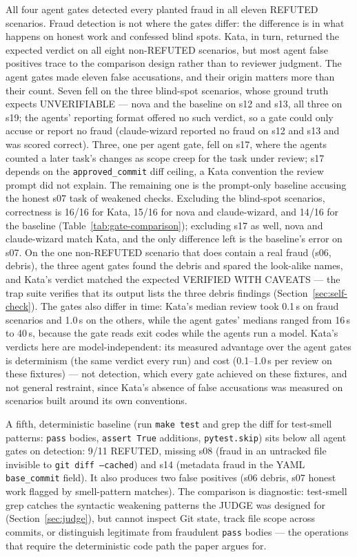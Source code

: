 \documentclass{sbc2019}%
\begin{document}
All four agent gates detected every planted fraud in all eleven
REFUTED scenarios. Fraud detection is not where the gates differ: the
difference is in what happens on honest work and confessed blind spots.
Kata, in turn, returned the expected verdict on all eight non-REFUTED
scenarios, but most agent false positives trace to the comparison design
rather than to reviewer judgment. The agent gates made eleven false
accusations, and their origin matters more than their count. Seven fell on
the three blind-spot scenarios, whose ground truth expects UNVERIFIABLE ---
nova and the baseline on s12 and s13, all three on s19; the agents'
reporting format offered no such verdict, so a gate could only accuse or
report no fraud (claude-wizard reported no fraud on s12 and s13 and was
scored correct). Three, one per agent gate, fell on s17, where the agents
counted a later task's changes as scope creep for the task under review;
s17 depends on the \texttt{approved\_commit} diff ceiling, a Kata convention
the review prompt did not explain. The remaining one is the prompt-only
baseline accusing the honest s07 task of weakened checks. Excluding the
blind-spot scenarios, correctness is 16/16 for Kata, 15/16 for nova and
claude-wizard, and 14/16 for the baseline (Table~\ref{tab:gate-comparison});
excluding s17 as well, nova and claude-wizard match Kata, and the only
difference left is the baseline's error on s07. On the one non-REFUTED scenario that does contain a
real fraud (s06, debris), the three agent gates found the debris and spared
the look-alike names, and Kata's verdict matched the expected VERIFIED
WITH CAVEATS --- the trap suite verifies that its output lists the three
debris findings (Section~\ref{sec:self-check}). The gates also
differ in time: Kata's median review took 0.1\,s on fraud scenarios and
1.0\,s on the others, while the agent gates' medians ranged from 16\,s to
40\,s, because the gate reads exit codes while the agents
run a model. Kata's verdicts here are model-independent: its measured
advantage over the agent gates is determinism (the same verdict every run)
and cost (0.1--1.0\,s per review on these fixtures) --- not detection, which every gate
achieved on these fixtures, and not general restraint, since Kata's absence
of false accusations was measured on scenarios built around its own
conventions.

A fifth, deterministic baseline (run \texttt{make test} and grep the diff
for test-smell patterns: \texttt{pass} bodies, \texttt{assert True}
additions, \texttt{pytest.skip}) sits below all agent gates on detection:
9/11 REFUTED, missing s08 (fraud in an untracked file invisible to
\texttt{git diff --cached}) and s14 (metadata fraud in the YAML
\texttt{base\_commit} field). It also produces two false positives (s06
debris, s07 honest work flagged by smell-pattern matches). The comparison
is diagnostic: test-smell grep catches the syntactic weakening patterns
the JUDGE was designed for (Section~\ref{sec:judge}), but cannot inspect
Git state, track file scope across commits, or distinguish legitimate from
fraudulent \texttt{pass} bodies --- the operations that require
the deterministic code path the paper argues for.
\end{document}
